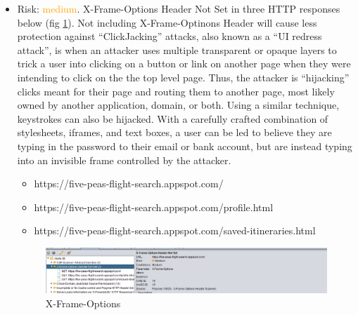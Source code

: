 \documentclass[12pt, a4paper]{article}
\begin{document}
\begin{itemize}
    \item Risk: \textcolor{orange}{medium}. X-Frame-Options Header Not Set in three HTTP responses below (fig \ref{fig:zap_x}). Not including X-Frame-Optinons Header will cause less protection against ``ClickJacking'' attacks, also known as a “UI redress attack”, is when an attacker uses multiple transparent or opaque layers to trick a user into clicking on a button or link on another page when they were intending to click on the the top level page. Thus, the attacker is “hijacking” clicks meant for their page and routing them to another page, most likely owned by another application, domain, or both. Using a similar technique, keystrokes can also be hijacked. With a carefully crafted combination of stylesheets, iframes, and text boxes, a user can be led to believe they are typing in the password to their email or bank account, but are instead typing into an invisible frame controlled by the attacker.
    \begin{itemize}
        \item https://five-peas-flight-search.appspot.com/
        \item https://five-peas-flight-search.appspot.com/profile.html
        \item https://five-peas-flight-search.appspot.com/saved-itineraries.html
    \end{itemize}
    \begin{figure}[ht]
    \centering
    \includegraphics[width=\textwidth, frame]{zap_x.png}
    \caption{X-Frame-Options}
    \label{fig:zap_x}
    \end{figure}
    

\end{itemize}
\end{document}
